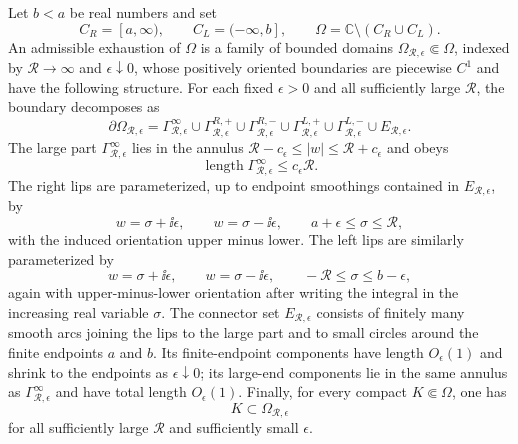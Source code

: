 \begin{definition}
\label{def:admissible-fixed-t-two-cut-exhaustion}
Let \(b<a\) be real numbers and set
\[
  C_R=[a,\infty),\qquad C_L=(-\infty,b],\qquad
  \Omega=\mathbb C\setminus(C_R\cup C_L).
\]
An admissible exhaustion of \(\Omega\) is a family of bounded domains
\(\Omega_{\mathcal R,\epsilon}\Subset\Omega\), indexed by
\(\mathcal R\to\infty\) and \(\epsilon\downarrow0\), whose positively
oriented boundaries are piecewise \(C^1\) and have the following structure.
For each fixed \(\epsilon>0\) and all sufficiently large
\(\mathcal R\), the boundary decomposes as
\begin{equation}
  \partial\Omega_{\mathcal R,\epsilon}
  =
  \Gamma^\infty_{\mathcal R,\epsilon}
  \cup
  \Gamma^{R,+}_{\mathcal R,\epsilon}
  \cup
  \Gamma^{R,-}_{\mathcal R,\epsilon}
  \cup
  \Gamma^{L,+}_{\mathcal R,\epsilon}
  \cup
  \Gamma^{L,-}_{\mathcal R,\epsilon}
  \cup
  E_{\mathcal R,\epsilon}.
  \label{eq:fixed-t-admissible-boundary-decomposition}
\end{equation}
The large part \(\Gamma^\infty_{\mathcal R,\epsilon}\) lies in the annulus
\(\mathcal R-c_\epsilon\le |w|\le \mathcal R+c_\epsilon\) and obeys
\begin{equation}
  \operatorname{length}\Gamma^\infty_{\mathcal R,\epsilon}
  \le c_\epsilon\mathcal R .
  \label{eq:fixed-t-admissible-large-length}
\end{equation}
The right lips are parameterized, up to endpoint smoothings contained in
\(E_{\mathcal R,\epsilon}\), by
\begin{equation}
  w=\sigma+\ii\epsilon,\qquad
  w=\sigma-\ii\epsilon,
  \qquad
  a+\epsilon\le \sigma\le \mathcal R ,
  \label{eq:fixed-t-admissible-right-lips}
\end{equation}
with the induced orientation upper minus lower.  The left lips are similarly
parameterized by
\begin{equation}
  w=\sigma+\ii\epsilon,\qquad
  w=\sigma-\ii\epsilon,
  \qquad
  -\mathcal R\le \sigma\le b-\epsilon ,
  \label{eq:fixed-t-admissible-left-lips}
\end{equation}
again with upper-minus-lower orientation after writing the integral in the
increasing real variable \(\sigma\).  The connector set
\(E_{\mathcal R,\epsilon}\) consists of finitely many smooth arcs joining the
lips to the large part and to small circles around the finite endpoints
\(a\) and \(b\).  Its finite-endpoint components have length
\(O_\epsilon(1)\) and shrink to the endpoints as \(\epsilon\downarrow0\);
its large-end components lie in the same annulus as
\(\Gamma^\infty_{\mathcal R,\epsilon}\) and have total length
\(O_\epsilon(1)\).  Finally, for every compact
\(K\Subset\Omega\), one has
\[
  K\subset\Omega_{\mathcal R,\epsilon}
\]
for all sufficiently large \(\mathcal R\) and sufficiently small
\(\epsilon\).


\end{definition}
